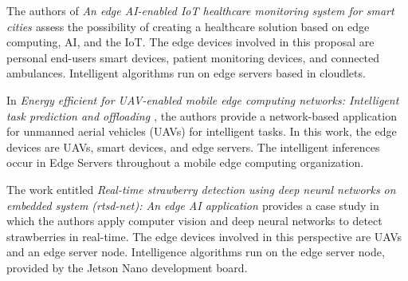 
The authors of \textit{An edge AI-enabled IoT healthcare monitoring system for smart cities \cite{rathi2021edge}} assess the possibility of creating a healthcare solution based on edge computing, AI, and the IoT. The edge devices involved in this proposal are personal end-users smart devices, patient monitoring devices, and connected ambulances. Intelligent algorithms run on edge servers based in cloudlets.



In \textit{Energy efficient for UAV-enabled mobile edge computing networks: Intelligent task prediction and offloading \cite{wu2020energy}}, the authors provide a network-based application for unmanned aerial vehicles (UAVs) for intelligent tasks. In this work, the edge devices are UAVs, smart devices, and edge servers. The intelligent inferences occur in Edge Servers throughout a mobile edge computing organization. 



The work entitled \textit{Real-time strawberry detection using deep neural networks on embedded system (rtsd-net): An edge AI application \cite{zhang2022real}} provides a case study in which the authors apply computer vision and deep neural networks to detect strawberries in real-time. The edge devices involved in this perspective are UAVs and an edge server node. Intelligence algorithms run on the edge server node, provided by the Jetson Nano development board.



